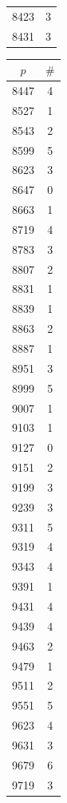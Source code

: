 \documentclass{article}
\theoremstyle{definition}
\begin{document}
\begin{table}[htbp]
\begin{minipage}{0.135\textwidth}
\begin{tabular}{c|c}
        8423 & 3 \\
        8431 & 3
    \end{tabular}
\end{minipage}\hspace{-2mm}
%
\begin{minipage}{0.135\textwidth}
    \centering
    \begin{tabular}{c|c}
        $p$ & $\#$ \\ \hline
        8447 & 4 \\
        8527 & 1 \\
        8543 & 2 \\
        8599 & 5 \\
        8623 & 3 \\
        8647 & 0 \\
        8663 & 1 \\
        8719 & 4 \\
        8783 & 3 \\
        8807 & 2 \\
        8831 & 1 \\
        8839 & 1 \\
        8863 & 2 \\
        8887 & 1 \\
        8951 & 3 \\
        8999 & 5 \\
        9007 & 1 \\
        9103 & 1 \\
        9127 & 0 \\
        9151 & 2 \\
        9199 & 3 \\
        9239 & 3 \\
        9311 & 5 \\
        9319 & 4 \\
        9343 & 4 \\
        9391 & 1 \\
        9431 & 4 \\
        9439 & 4 \\
        9463 & 2 \\
        9479 & 1 \\
        9511 & 2 \\
        9551 & 5 \\
        9623 & 4 \\
        9631 & 3 \\
        9679 & 6 \\
        9719 & 3 \\

\end{tabular}
\end{minipage}
\end{table}
\end{document}

